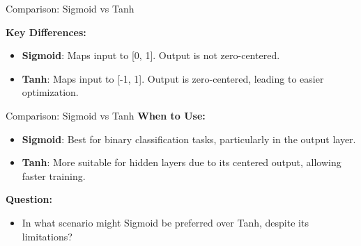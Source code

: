 \documentclass[serif, aspectratio=169]{beamer}
\begin{document}
\begin{frame}{Comparison: Sigmoid vs Tanh}

    \textbf{Key Differences:}
    \begin{itemize}
        \item \textbf{Sigmoid}: Maps input to [0, 1]. Output is not zero-centered.
        \item \textbf{Tanh}: Maps input to [-1, 1]. Output is zero-centered, leading to easier optimization.
    \end{itemize}

    \begin{center}
    \end{center}

\end{frame}
\begin{frame}{Comparison: Sigmoid vs Tanh}
        \textbf{When to Use:}
    \begin{itemize}
        \item \textbf{Sigmoid}: Best for binary classification tasks, particularly in the output layer.
        \item \textbf{Tanh}: More suitable for hidden layers due to its centered output, allowing faster training.
    \end{itemize}
    \textbf{Question:}
    \begin{itemize}
        \item In what scenario might Sigmoid be preferred over Tanh, despite its limitations?
    \end{itemize}
\end{frame}
\end{document}
